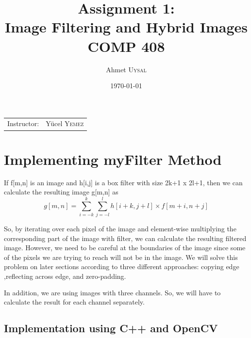 \documentclass{article}
\title{Assignment 1: \\ Image Filtering and Hybrid Images\\ COMP 408} %
\author{Ahmet \textsc{Uysal}} %
\date{\today} %
\begin{document}
\maketitle %

\begin{center}
\begin{tabular}{l r}
Instructor: & Y\"ucel  \textsc{Yemez} %
\end{tabular}
\end{center}



\section{Implementing myFilter Method}	


If f[m,n] is an image and h[i,j] is a box filter with size 2k+1 x 2l+1, then we can calculate the resulting image g[m,n] as
\begin{equation}
g[m,n] =\sum\limits_{i=-k}^k \sum\limits_{j = -l }^l h[i+k, j+l] \times f[m+i, n+j]
\end{equation}

So, by iterating over each pixel of the image and element-wise multiplying the corresponding part of the image with filter, we can calculate the resulting filtered image. However, we need to be careful at the boundaries of the image since some of the pixels we are trying to reach will not be in the image. We will solve this problem on later sections according to three different approaches: copying edge ,reflecting across edge, and zero-padding.

In addition, we are using images with three channels. So, we will have to calculate the result for each channel separately.


\subsection{Implementation using C++ and OpenCV}
\end{document}
